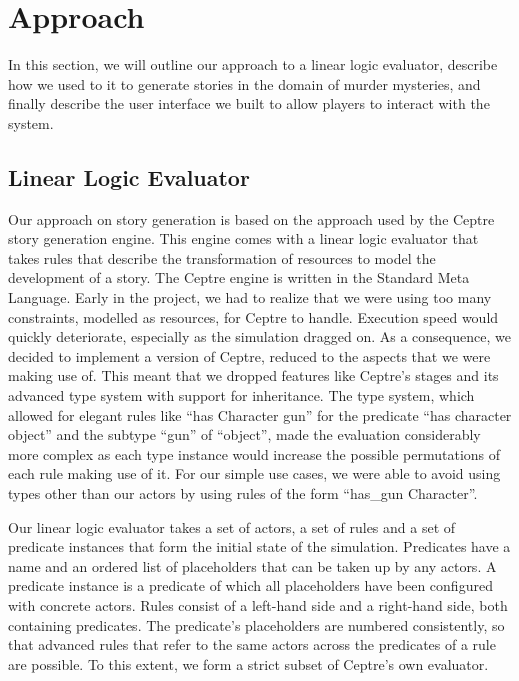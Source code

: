 \section{Approach} \label{approach}

In this section, we will outline our approach to a linear logic evaluator, describe how we used to it to generate stories in the domain of murder mysteries, and finally describe the user interface we built to allow players to interact with the system.

\subsection{Linear Logic Evaluator}

Our approach on story generation is based on the approach used by the Ceptre story generation engine. This engine comes with a linear logic evaluator that takes rules that describe the transformation of resources to model the development of a story. The Ceptre engine is written in the Standard Meta Language. Early in the project, we had to realize that we were using too many constraints, modelled as resources, for Ceptre to handle. Execution speed would quickly deteriorate, especially as the simulation dragged on. As a consequence, we decided to implement a version of Ceptre, reduced to the aspects that we were making use of. This meant that we dropped features like Ceptre's stages and its advanced type system with support for inheritance. The type system, which allowed for elegant rules like \enquote{has Character gun} for the predicate \enquote{has character object} and the subtype \enquote{gun} of \enquote{object}, made the evaluation considerably more complex as each type instance would increase the possible permutations of each rule making use of it. For our simple use cases, we were able to avoid using types other than our actors by using rules of the form \enquote{has\_gun Character}.

Our linear logic evaluator takes a set of actors, a set of rules and a set of predicate instances that form the initial state of the simulation. Predicates have a name and an ordered list of placeholders that can be taken up by any actors. A predicate instance is a predicate of which all placeholders have been configured with concrete actors. Rules consist of a left-hand side and a right-hand side, both containing predicates. The predicate's placeholders are numbered consistently, so that advanced rules that refer to the same actors across the predicates of a rule are possible. To this extent, we form a strict subset of Ceptre's own evaluator. 


